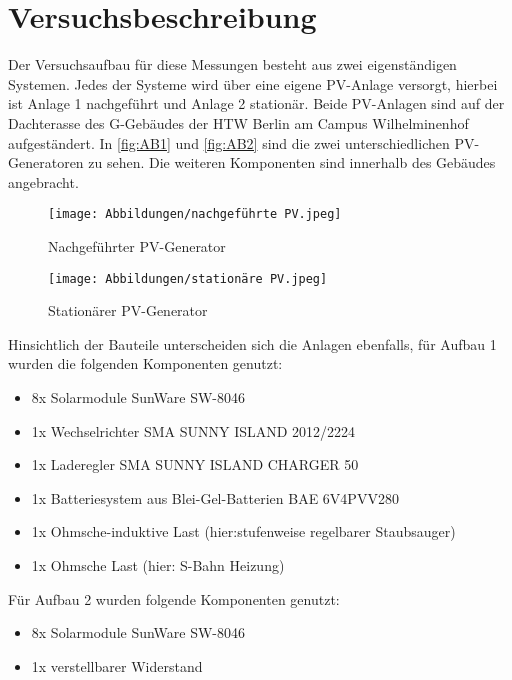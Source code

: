 \newpage
\section{Versuchsbeschreibung}
\label{section:Versuchsbeschreibung}
Der Versuchsaufbau für diese Messungen besteht aus zwei eigenständigen Systemen.
Jedes der Systeme wird über eine eigene PV-Anlage versorgt, hierbei ist Anlage 1 nachgeführt und Anlage 2 stationär. Beide PV-Anlagen sind auf
der Dachterasse des G-Gebäudes der HTW Berlin am Campus Wilhelminenhof aufgeständert.
In \autoref{fig:AB1}  und \autoref{fig:AB2} sind die zwei unterschiedlichen PV-Generatoren
zu sehen. Die weiteren Komponenten sind innerhalb des Gebäudes angebracht.\\
%
\begin{figure}[H]
	\centering
	\begin{minipage}{0.49\textwidth}
		\centering
		\texttt{[image: Abbildungen/nachgeführte PV.jpeg]}
		\caption{Nachgeführter PV-Generator}	
		\label{fig:AB1}
	\end{minipage}
	\hfill
\begin{minipage}{0.49\textwidth}
	\centering
	\texttt{[image: Abbildungen/stationäre PV.jpeg]}
	\caption{Stationärer PV-Generator}
	\label{fig:AB2}
\end{minipage}
\end{figure}
%
\newpage
Hinsichtlich der Bauteile unterscheiden sich die Anlagen ebenfalls, für Aufbau 1 
wurden die folgenden Komponenten genutzt:
\begin{itemize}
	\item 8x Solarmodule SunWare SW-8046 
	\item 1x Wechselrichter SMA SUNNY ISLAND 2012/2224 
	\item 1x Laderegler SMA SUNNY ISLAND CHARGER 50 
	\item 1x Batteriesystem aus Blei-Gel-Batterien BAE 6V4PVV280
	\item 1x Ohmsche-induktive Last (hier:stufenweise regelbarer Staubsauger)
	\item 1x Ohmsche Last (hier: S-Bahn Heizung)
\end{itemize}

Für Aufbau 2 wurden folgende Komponenten genutzt:
\begin{itemize}
	\item 8x Solarmodule SunWare SW-8046 
	\item 1x verstellbarer Widerstand
\end{itemize}
